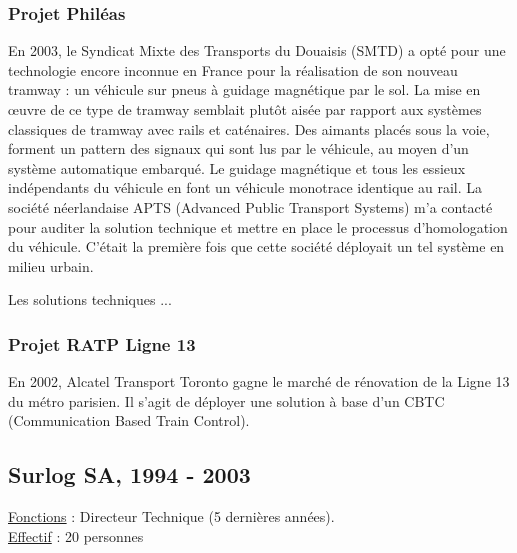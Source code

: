 \documentclass[a4paper,12pt]{article}
\begin{document}
\subsubsection{Projet Phil\'eas}
En 2003, le Syndicat Mixte des Transports du Douaisis (SMTD) a opt\'e
pour une technologie encore inconnue en France pour la r\'ealisation
de son nouveau tramway : un v\'ehicule sur pneus \`a guidage
magn\'etique par le sol.  La mise en \oe{}uvre de ce type de tramway
semblait plut\^ot ais\'ee par rapport aux syst\`emes classiques de
tramway avec rails et cat\'enaires.  Des aimants plac\'es sous la
voie, forment un pattern des signaux qui sont lus par le v\'ehicule,
au moyen d'un syst\`eme automatique embarqu\'e.  Le guidage
magn\'etique et tous les essieux ind\'ependants du v\'ehicule en font
un v\'ehicule monotrace identique au rail.  La soci\'et\'e
n\'eerlandaise APTS (Advanced Public Transport Systems) m'a contact\'e
pour auditer la solution technique et mettre en place le processus
d'homologation du v\'ehicule. C'\'etait la premi\`ere fois que cette
soci\'et\'e d\'eployait un tel syst\`eme en milieu urbain.

Les solutions techniques ...

\subsubsection{Projet RATP Ligne 13}
En 2002, Alcatel Transport Toronto gagne le march\'e de r\'enovation
de la Ligne 13 du m\'etro parisien. Il s'agit de d\'eployer une
solution \`a base d'un CBTC (Communication Based Train Control).


\subsection{Surlog SA, 1994 - 2003}
\hspace{-0.6cm}\underline{Fonctions} : Directeur Technique (5 derni\`eres ann\'ees).
\\
\underline{Effectif} : 20 personnes
\\
\end{document}
